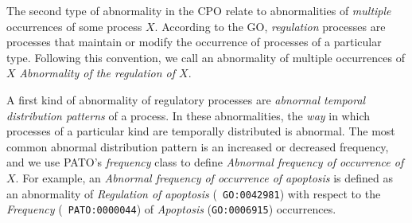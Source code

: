 \documentclass{bioinfo}
\begin{document}
The second type of abnormality in the CPO relate to abnormalities of
{\em multiple} occurrences of some process $X$. According to the GO,
{\em regulation} processes are processes that maintain or modify the
occurrence of processes of a particular type. Following this
convention, we call an abnormality of multiple occurrences of $X$ {\em
  Abnormality of the regulation of $X$}.


A first kind of abnormality of regulatory processes are {\em abnormal
  temporal distribution patterns} of a process. In these
abnormalities, the {\em way} in which processes of a particular kind
are temporally distributed is abnormal.  The most common abnormal
distribution pattern is an increased or decreased frequency, and we
use PATO's {\em frequency} class to define {\em Abnormal frequency of
  occurrence of $X$}.
For example, an {\em Abnormal frequency of occurrence of apoptosis} is
defined as an abnormality of {\em Regulation of apoptosis} ({\tt
  GO:0042981}) with respect to the {\em Frequency} ({\tt
  PATO:0000044}) of {\em Apoptosis} ({\tt GO:0006915}) occurrences.
\end{document}
